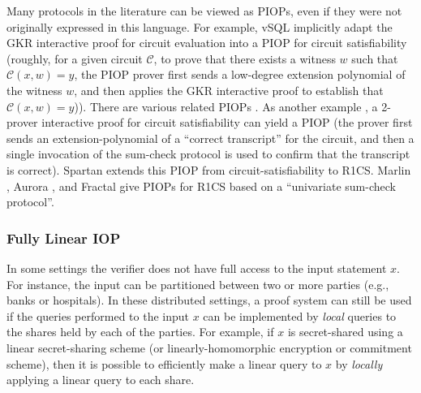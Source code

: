 Many protocols in the literature can be viewed as PIOPs, even if they were not originally expressed in this language. 
For example, vSQL \cite{2017:SP:vSQL} implicitly adapt the GKR interactive proof \cite{2008:GKR} for circuit evaluation into a PIOP for circuit satisfiability (roughly, for a given circuit $\mathcal{C}$, to prove that there exists a witness $w$ such that $\mathcal{C}(x, w)=y$, the PIOP prover first sends a low-degree extension polynomial of the witness $w$, and then applies the GKR interactive proof to establish that $\mathcal{C}(x,w)=y$)).
There are various related PIOPs \cite{2020:ZXZS:virgo, 2021:ZWZZ:virgo++,2018:SP:Doubly-efficient-zkSNARKs-without-trusted-setup, 2019:XZZPS:crypto:libra}.
As another example \cite{2014:BTVW:eprint:verifiable-computation-using-multiple-provers}, a 2-prover interactive proof for circuit satisfiability can yield a PIOP (the prover first sends an extension-polynomial of a ``correct transcript'' for the circuit, and then a single invocation of the sum-check protocol \cite{1992:LFKN:algebraic} is used to confirm that the transcript is correct). 
Spartan \cite{setty2020spartan} extends this PIOP from circuit-satisfiability to R1CS.
Marlin \cite{2020:CHMMVW:Marlin}, Aurora \cite{2018:CRSVW:aurora}, and Fractal \cite{2020:COS:Fractal} give PIOPs for R1CS based on a ``univariate sum-check protocol''.

\subsubsection{Fully Linear IOP}
\label{paradigms:IT:linear-IOP:fully-linear-IOP}

In some settings the verifier does not have full access to the input statement $x$.
For instance, the input can be partitioned between two or more parties (e.g., banks or hospitals).
In these distributed settings, a proof system can still be used if the queries performed to the input $x$ can be implemented by \emph{local} queries to the shares held by each of the parties. 
For example, if $x$ is secret-shared using a linear secret-sharing scheme (or linearly-homomorphic encryption or commitment scheme), then it is possible to efficiently make a linear query to $x$ by  {\em locally} applying a linear query to each share.
\loosen

